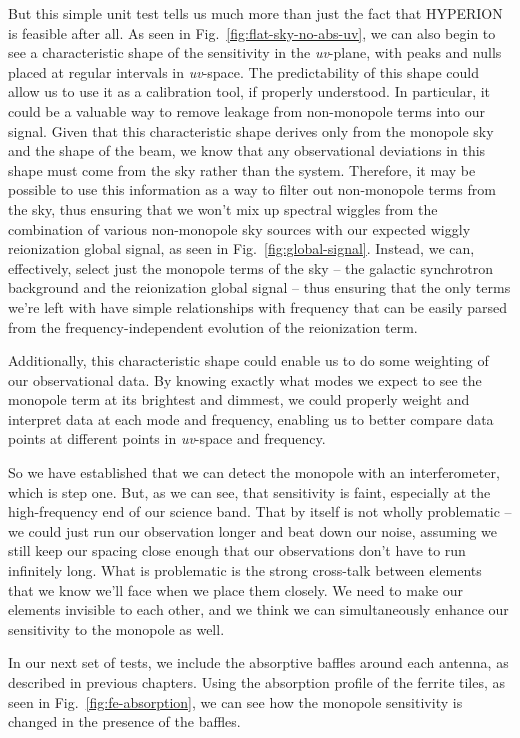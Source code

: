 But this simple unit test tells us much more than just the fact that HYPERION 
is feasible after all. As seen in Fig.~\ref{fig:flat-sky-no-abs-uv}, we can 
also begin to see a characteristic shape of the sensitivity in the 
\emph{uv}-plane, with peaks and nulls placed at regular intervals in 
\emph{uv}-space. The predictability of this shape could allow us to use it as a 
calibration tool, if properly understood. In particular, it could be a valuable 
way to remove leakage from non-monopole terms into our signal. Given that this 
characteristic shape derives only from the monopole sky and the shape of the 
beam, we know that any observational deviations in this shape must come from 
the sky rather than the system.  Therefore, it may be possible to use this 
information as a way to filter out non-monopole terms from the sky, thus 
ensuring that we won't mix up spectral wiggles from the combination of various 
non-monopole sky sources with our expected wiggly reionization global signal, 
as seen in Fig.~\ref{fig:global-signal}. Instead, we can, effectively, select 
just the monopole terms of the sky -- the galactic synchrotron background and 
the reionization global signal -- thus ensuring that the only terms we're left 
with have simple relationships with frequency that can be easily parsed from 
the frequency-independent evolution of the reionization term.

Additionally, this characteristic shape could enable  us to do some weighting 
of our observational data. By knowing exactly what modes we expect to see the 
monopole term at its brightest and dimmest, we could properly weight and 
interpret data at each mode and frequency, enabling us to better compare data 
points at different points in \emph{uv}-space and frequency.

So we have established that we can detect the monopole with an interferometer, 
which is step one. But, as we can see, that sensitivity is faint, especially at 
the high-frequency end of our science band. That by itself is not wholly 
problematic -- we could just run our observation longer and beat down our 
noise, assuming we still keep our spacing close enough that our observations 
don't have to run infinitely long. What is problematic is the strong cross-talk 
between elements that we know we'll face when we place them closely. We need to 
make our elements invisible to each other, and we think we can simultaneously 
enhance our sensitivity to the monopole as well.

In our next set of tests, we include the absorptive baffles around each 
antenna, as described in previous chapters. Using the absorption profile of the 
ferrite tiles, as seen in Fig.~\ref{fig:fe-absorption}, we can see how the 
monopole sensitivity is changed in the presence of the baffles.

